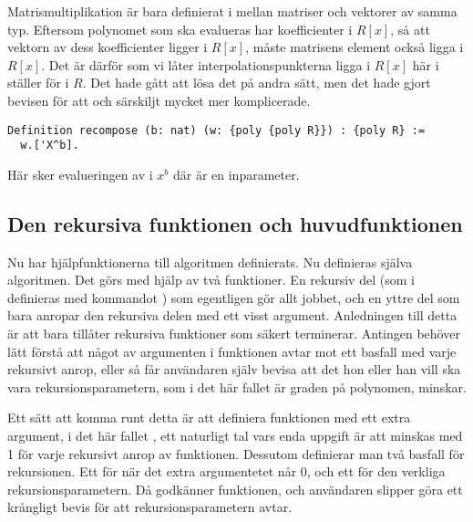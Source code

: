Matrismultiplikation är bara definierat i \ssr mellan matriser och vektorer av
samma typ. Eftersom polynomet  som ska evalueras har koefficienter i
$R[x]$, så att vektorn av dess koefficienter ligger i $R[x]$, måste matrisens
element också ligga i $R[x]$. Det är därför som vi låter
interpolationspunkterna ligga i $R[x]$ här i ställer för i $R$. Det hade gått
att lösa det på andra sätt, men det hade gjort bevisen för att  och
särskiljt  mycket mer komplicerade.

\begin{lstlisting}
Definition recompose (b: nat) (w: {poly {poly R}}) : {poly R} :=
  w.['X^b].
\end{lstlisting}
Här sker evalueringen av  i $x^b$ där  är en inparameter.

\subsection{Den rekursiva funktionen och huvudfunktionen}

Nu har hjälpfunktionerna till algoritmen definierats. Nu definieras själva
algoritmen. Det görs med hjälp av två funktioner. En rekursiv del (som i \coq
definieras med kommandot ) som egentligen
gör allt jobbet, och en yttre del som bara anropar den rekursiva delen med
ett visst argument. Anledningen till detta är att \coq bara tillåter rekursiva
funktioner som säkert terminerar. Antingen behöver \coq lätt förstå att något av
argumenten i funktionen avtar mot ett basfall med varje rekursivt anrop, eller så får
användaren själv bevisa att det hon eller han vill ska vara rekursionsparametern, som
i det här fallet är graden på polynomen, minskar.

Ett sätt att komma runt detta är att definiera funktionen med ett extra argument,
i det här fallet , ett naturligt tal vars enda uppgift är att minskas med 1
för varje rekursivt anrop av funktionen. Dessutom definierar man två basfall för
rekursionen. Ett för när det extra argumentetet  når 0,
och ett för den verkliga rekursionsparametern. Då godkänner \coq funktionen, och
användaren slipper göra ett krångligt bevis för att rekursionsparametern avtar.

